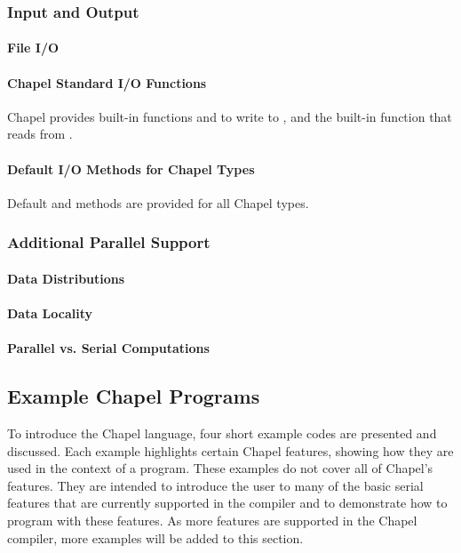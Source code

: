 \subsubsection{Input and Output}
\paragraph{File I/O}

\paragraph{Chapel Standard I/O Functions}
Chapel provides built-in functions  and 
to write to , and the built-in function 
that reads from .

\paragraph{Default I/O Methods for Chapel Types}
Default  and  methods are provided for all
Chapel types.


\subsubsection{Additional Parallel Support}
\paragraph{Data Distributions}
\paragraph{Data Locality}
\paragraph{Parallel vs. Serial Computations}

\subsection{Example Chapel Programs}

To introduce the Chapel language, four short example codes are presented and
discussed.  Each example highlights certain Chapel features, showing how they are used
in the context of a program.  These examples do not cover all of Chapel's features.
They are intended to introduce the user to many of the basic serial features that are
currently supported in the compiler and to demonstrate how to program with 
these features.  As more features are supported in the Chapel compiler, more 
examples will be added to this section.

